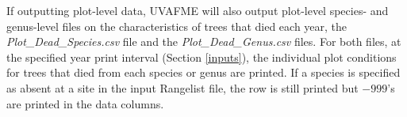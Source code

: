\documentclass[a4paper, 12pt] {article}
\begin{document}
\begin{table} [H]
\caption{\textit{Plot\_Genus\_Data.csv}  file output variables.}
\label{tab:outgenpltab}
\end{table}

If outputting plot-level data, UVAFME will also output plot-level species- and genus-level files on the characteristics of trees that died each year, the \textit{Plot\_Dead\_Species.csv} file and the \textit{Plot\_Dead\_Genus.csv} files. For both files, at the specified year print interval (Section \ref{inputs}), the individual plot conditions for trees that died from each species or genus are printed. If a species is specified as absent at a site in the input Rangelist file, the row is still printed but $-999$'s are printed in the data columns.
\end{document}
